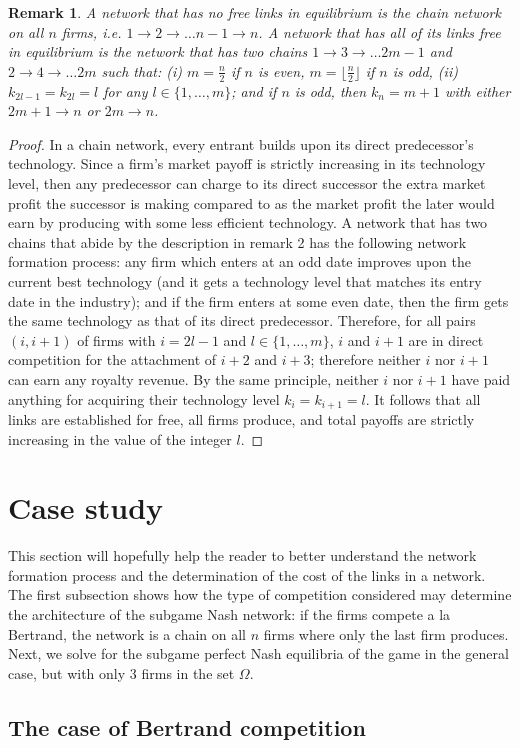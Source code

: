 \documentclass{article}
\newtheorem{remark}{Remark}
\begin{document}
\begin{remark}
A network that has no free links in equilibrium is the chain network on all $n$ firms, i.e. $1\rightarrow 2\rightarrow \ldots n-1 \rightarrow n$. A network that has all of its links free in equilibrium is the network that has two chains $1\rightarrow 3\rightarrow \ldots 2m-1$ and $2\rightarrow 4 \rightarrow \ldots 2m$ such that: (i) $m=\frac{n}{2}$ if $n$ is even, $m=\lfloor \frac{n}{2} \rfloor$ if $n$ is odd, (ii) $k_{2l-1}=k_{2l}=l$ for any $l\in \{1,\ldots, m\}$; and if $n$ is odd, then $k_n=m+1$ with either $2m+1\rightarrow n$ or $2m\rightarrow n$.  
\end{remark} 
\begin{proof}
In a chain network, every entrant builds upon its direct predecessor's technology. Since a firm's market payoff is strictly increasing in its technology level, then any predecessor can charge to its direct successor the extra market profit the successor is making compared to as the market profit the later would earn by producing with some less efficient technology. A network that has two chains that abide by the description in remark 2 has the following network formation process: any firm which enters at an odd date improves upon the current best technology (and it gets a technology level that matches its entry date in the industry); and if the firm enters at some even date, then the firm gets the same technology as that of its direct predecessor. Therefore, for all pairs $(i,i+1)$ of firms with $i=2l-1$ and $l\in \{1,\ldots, m\}$, $i$ and $i+1$ are in direct competition for the attachment of $i+2$ and $i+3$; therefore neither $i$ nor $i+1$ can earn any royalty revenue. By the same principle, neither $i$ nor $i+1$ have paid anything for acquiring their technology level $k_i=k_{i+1}=l$. It follows that all links are established for free, all firms produce, and total payoffs are strictly increasing in the value of the integer $l$. 
\end{proof}


\section{Case study}
This section will hopefully help the reader to better understand the network formation process and the determination of the cost of the links in a network. The first subsection shows how the type of competition considered may determine the architecture of the subgame Nash network: if the firms compete a la Bertrand, the network is a chain on all $n$ firms where only the last firm produces. Next, we solve for the subgame perfect Nash equilibria of the game in the general case, but with only 3 firms in the set $\Omega$.
    
\subsection{The case of Bertrand competition}




\end{document}
